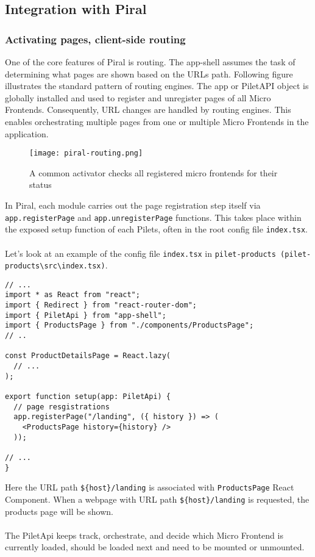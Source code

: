\documentclass[a4paper]{book}
\begin{document}
\subsection{Integration with Piral} \label{Integration with Pira}

\subsubsection{Activating pages, client-side routing}
One of the core features of Piral is routing. The app-shell assumes the task of determining what pages are shown based on the URLs path. Following figure illustrates the standard pattern of routing engines. The app or PiletAPI object is globally installed and used to register and unregister pages of all Micro Frontends. Consequently, URL changes are handled by routing engines. This enables orchestrating multiple pages from one or multiple Micro Frontends in the application.
\begin{figure}[h!]
  \centering
  \captionsetup{justification=centering}
  \texttt{[image: piral-routing.png]}
  \caption{A common activator checks all registered micro frontends for their status \cite{Rap20}}
  \label{fig:piral-routing}
\end{figure}

In Piral, each module carries out the page registration step itself via \verb|app.registerPage| and \verb|app.unregisterPage| functions. This takes place within the exposed setup function of each Pilets, often in the root config file \verb|index.tsx|.
\\ \\
Let’s look at an example of the config file \verb|index.tsx| in \verb|pilet-products (pilet-products\src\index.tsx)|.

\begin{lstlisting}[caption={pilet-products index.tsx}]
// ...
import * as React from "react";
import { Redirect } from "react-router-dom";
import { PiletApi } from "app-shell";
import { ProductsPage } from "./components/ProductsPage";
// ..

const ProductDetailsPage = React.lazy(
  // ...
);

export function setup(app: PiletApi) {
  // page resgistrations
  app.registerPage("/landing", ({ history }) => (
    <ProductsPage history={history} />
  ));

// ...
}
\end{lstlisting}

Here the URL path \verb|${host}/landing| is associated with \verb|ProductsPage| React Component. When a webpage with URL path \verb|${host}/landing| is requested, the products page will be shown.
\\ \\
The PiletApi keeps track, orchestrate, and decide which Micro Frontend is currently loaded, should be loaded next and need to be mounted or unmounted.
\end{document}
